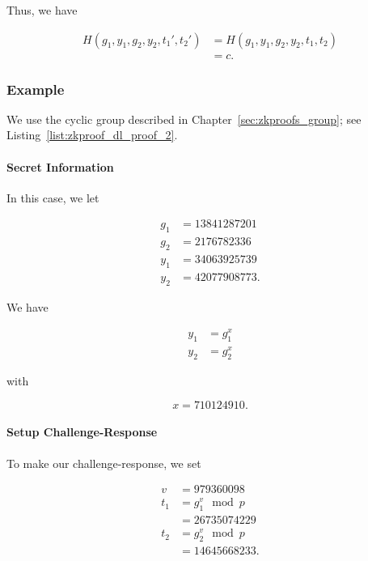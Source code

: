 \noindent
Thus, we have

\begin{align}
    H(g_{1},y_{1}, g_{2},y_{2},t_{1}',t_{2}')
        &= H(g_{1},y_{1}, g_{2},y_{2},t_{1},t_{2}) \nonumber\\
        &= c.
\end{align}

\subsubsection{Example}

\begin{example}

We use the \gls{cyclic group} described in Chapter~\ref{sec:zkproofs_group};
see Listing~\ref{list:zkproof_dl_proof_2}.

\paragraph{Secret Information}
In this case, we let

\begin{align}
    g_{1} &= 13841287201
        \nonumber\\
    g_{2} &= 2176782336
        \nonumber\\
    y_{1} &= 34063925739
        \nonumber\\
    y_{2} &= 42077908773.
\end{align}

\noindent
We have

\begin{align}
    y_{1} &= g_{1}^{x}
        \nonumber\\
    y_{2} &= g_{2}^{x}
\end{align}

\noindent
with

\begin{equation}
    x = 710124910.
\end{equation}

\paragraph{Setup Challenge-Response}
To make our challenge-response, we set

\begin{align}
    v &= 979360098 \nonumber\\
    t_{1} &= g_{1}^{v} \mod p \nonumber\\
        &= 26735074229 \nonumber\\
    t_{2} &= g_{2}^{v} \mod p \nonumber\\
        &= 14645668233.
\end{align}


\end{example}
